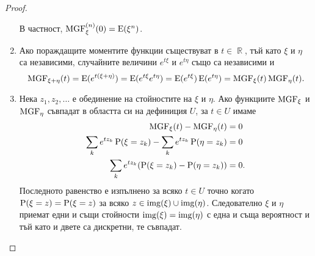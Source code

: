 \documentclass{../../common/topic}
\begin{document}
\begin{proof}
\begin{enumerate}
    В частност, \( \operatorname{MGF}^{(n)}_\xi(0) = \operatorname{E}(\xi^n) \).

    \item Ако пораждащите моментите функции съществуват в \( t \in \BbbR \), тъй като \( \xi \) и \( \eta \) са независими, случайните величини \( e^{t\xi} \) и \( e^{t\eta} \) също са независими и
    \begin{equation*}
      \operatorname{MGF}_{\xi + \eta}(t)
      =
      \operatorname{E}(e^{t(\xi + \eta)})
      =
      \operatorname{E}(e^{t\xi} e^{t\eta})
      =
      \operatorname{E}(e^{t\xi}) \operatorname{E}(e^{t\eta})
      =
      \operatorname{MGF}_\xi(t) \operatorname{MGF}_\eta(t).
    \end{equation*}

    \item Нека \( z_1, z_2, \ldots \) е обединение на стойностите на \( \xi \) и \( \eta \). Ако функциите \( \operatorname{MGF}_\xi \) и \( \operatorname{MGF}_\eta \) съвпадат в областта си на дефиниция \( U \), за \( t \in U \) имаме
    \begin{align*}
      \operatorname{MGF}_\xi(t) - \operatorname{MGF}_\eta(t) &= 0
      \\
      \sum_k e^{t z_k} \operatorname{P}(\xi = z_k) - \sum_k e^{t z_k} \operatorname{P}(\eta = z_k) &= 0
      \\
      \sum_k e^{t z_k} (\operatorname{P}(\xi = z_k) - \operatorname{P}(\eta = z_k)) &= 0.
    \end{align*}
    Последното равенство е изпълнено за всяко \( t \in U \) точно когато \( \operatorname{P}(\xi = z) = \operatorname{P}(\xi = z) \) за всяко \( z \in \operatorname{img}(\xi) \cup \operatorname{img}(\eta) \). Следователно \( \xi \) и \( \eta \) приемат едни и същи стойности \( \operatorname{img}(\xi) = \operatorname{img}(\eta) \) с една и съща вероятност и тъй като и двете са дискретни, те съвпадат.
  \end{enumerate}
\end{proof}
\end{document}
